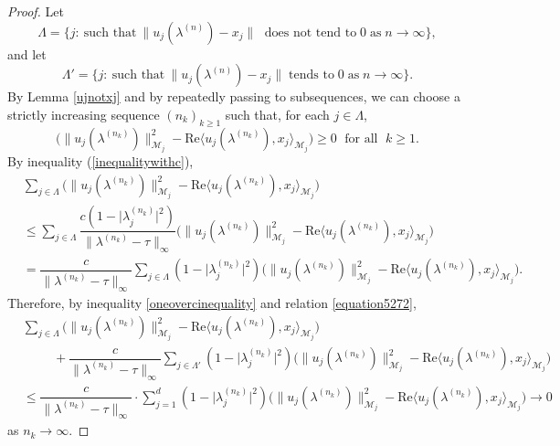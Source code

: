 \documentclass[10pt,a4paper]{amsart}
\begin{document}
\begin{proof}
Let $$\Lambda = \{ j: \ \text{such that} \ \|u_{j}(\lambda^{(n)}) - x_j\| \; \text{ does not tend to} \; 0 \; \text{as} \; n\rightarrow \infty \},$$
and let $$\Lambda'= \{ j: \ \text{such that} \ \|u_{j}(\lambda^{(n)}) - x_j\| \; \text{tends to} \; 0 \; \text{as} \; n \rightarrow \infty \}.$$
 By Lemma \ref{ujnotxj} and by repeatedly passing to subsequences, we can choose a strictly increasing sequence 
 $(n_k)_{k \ge 1}$ such that,  for each $j \in \Lambda$, 
$$\Big(\|u_{j}(\lambda^{(n_k)})\|_{\mathcal{M}_{j}}^{2}-\mathrm{Re} \langle u_{j}(\lambda^{(n_k)}),x_{j}\rangle_{\mathcal{M}_{j}} \Big) \geq 0  \; \text{ for all } \; k \ge1.$$
By inequality (\ref{inequalitywithc}), 
\begin{align}
& \sum_{j \in \Lambda}\Big(\|u_{j}(\lambda^{(n_k)})\|_{\mathcal{M}_{j}}^{2}-\mathrm{Re} \langle u_{j}(\lambda^{(n_k)}),x_{j}\rangle_{\mathcal{M}_{j}} \Big) \nonumber\\
& \leq \sum_{j \in \Lambda} \dfrac{c (1-\lvert \lambda^{(n_k)}_{j} \rvert^{2})}{\|\lambda^{(n_k)}-\tau\|_{\infty}} 
\Big(\|u_{j}(\lambda^{(n_k)})\|_{\mathcal{M}_{j}}^{2}-\mathrm{Re} \langle u_{j}(\lambda^{(n_k)}),x_{j}\rangle_{\mathcal{M}_{j}} \Big)\nonumber\\
&= \dfrac{c}{\|\lambda^{(n_k)}-\tau\|_{\infty}}\sum_{j \in \Lambda}(1-\lvert \lambda^{(n_k)}_{j} \rvert^{2})\Big(\|u_{j}(\lambda^{(n_k)})\|_{\mathcal{M}_{j}}^{2}-\mathrm{Re} \langle u_{j}(\lambda^{(n_k)}),x_{j}\rangle_{\mathcal{M}_{j}} \Big).\label{oneovercinequality}
\end{align}
Therefore, by inequality \eqref{oneovercinequality} and relation \eqref{equation5272},
\begin{align}
& \sum_{j \in \Lambda}\Big(\|u_{j}(\lambda^{(n_k)})\|_{\mathcal{M}_{j}}^{2}-\mathrm{Re} \langle u_{j}(\lambda^{(n_k)}),x_{j}\rangle_{\mathcal{M}_{j}} \Big) \nonumber\\
& \hspace{1cm} +\dfrac{c}{\|\lambda^{(n_k)}-\tau\|_{\infty}}\sum_{j \in \Lambda'}(1-\lvert \lambda^{(n_k)}_{j} \rvert^{2})\Big(\|u_{j}(\lambda^{(n_k)})\|_{\mathcal{M}_{j}}^{2}-\mathrm{Re} \langle u_{j}(\lambda^{(n_k)}),x_{j}\rangle_{\mathcal{M}_{j}} \Big)\nonumber\\
&\leq \dfrac{c}{\|\lambda^{(n_k)}-\tau\|_{\infty}}\cdot\sum_{j=1}^{d}(1-\lvert \lambda^{(n_k)}_{j} \rvert^{2})\Big(\|u_{j}(\lambda^{(n_k)})\|_{\mathcal{M}_{j}}^{2}-\mathrm{Re} \langle u_{j}(\lambda^{(n_k)}),x_{j}\rangle_{\mathcal{M}_{j}} \Big)
 \to 0  \label{oneovercinequality2}
\end{align}
 as $ n_k \rightarrow  \infty$.

\end{proof}
\end{document}
